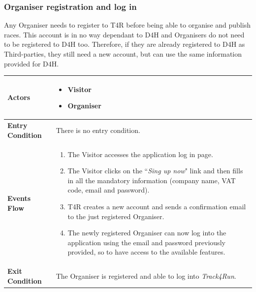         \subsubsection{Organiser registration and log in}
            Any Organiser needs to register to T4R before being able to organise and publish races. This account is in no way dependant to D4H and Organisers do not need to be registered to D4H too. Therefore, if they are already registered to D4H as Third-parties, they still need a new account, but can use the same information provided for D4H. 
            
            \begin{table}[H]
            	\centering
                
                \begin{tabular}{|p{3cm}|p{8.2cm}|}
                    \hline
                    \textbf{Actors} & \begin{itemize}
                        \item Visitor
                        \item Organiser
                    \end{itemize} \\
                     \hline
                    \textbf{Entry Condition} & There is no entry condition. \\
                     \hline
                    \textbf{Events Flow} & \begin{enumerate}
                                               \item The Visitor accesses the application log in page.
                                               \item The Visitor clicks on the ``\emph{Sing up now}" link and then fills in all the mandatory information (company name, VAT code, email and password).
                                               \item T4R creates a new account and sends a confirmation email to the just registered Organiser.
                                               \item The newly registered Organiser can now log into the application using the email and password previously provided, so to have access to the available features.
                                           \end{enumerate} \\
                     \hline
                    \textbf{Exit Condition} & The Organiser is registered and able to log into \emph{Track4Run}. \\

\end{tabular}
\end{table}
